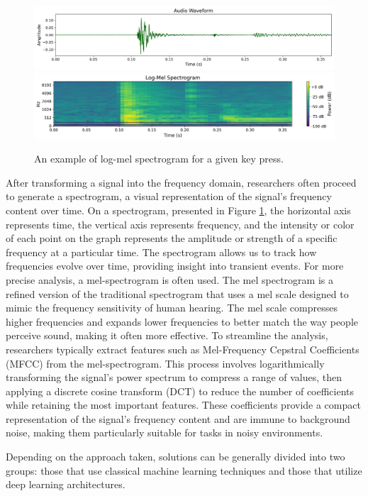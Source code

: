 \documentclass[a4paper,11pt,twoside]{report}
\theoremstyle{definition}
\begin{document}
\begin{figure}[h!]
    \centering
    \includegraphics[width=0.9\linewidth]{img_related_work/waveform.png}
    \includegraphics[width=0.9\linewidth]{img_related_work/log_mel_spectrogram.png}
    \caption{An example of log-mel spectrogram for a given key press.}
    \label{fig:spectogram}
\end{figure}

After transforming a signal into the frequency domain, researchers often proceed to generate a spectrogram, a visual representation of the signal's frequency content over time. On a spectrogram, presented in Figure \ref{fig:spectogram}, the horizontal axis represents time, the vertical axis represents frequency, and the intensity or color of each point on the graph represents the amplitude or strength of a specific frequency at a particular time. The spectrogram allows us to track how frequencies evolve over time, providing insight into transient events. For more precise analysis, a mel-spectrogram is often used. The mel spectrogram is a refined version of the traditional spectrogram that uses a mel scale designed to mimic the frequency sensitivity of human hearing. The mel scale compresses higher frequencies and expands lower frequencies to better match the way people perceive sound, making it often more effective. To streamline the analysis, researchers typically extract features such as Mel-Frequency Cepstral Coefficients (MFCC) from the mel-spectrogram. This process involves logarithmically transforming the signal's power spectrum to compress a range of values, then applying a discrete cosine transform (DCT) to reduce the number of coefficients while retaining the most important features. These coefficients provide a compact representation of the signal's frequency content and are immune to background noise, making them particularly suitable for tasks in noisy environments.

Depending on the approach taken, solutions can be generally divided into two groups: those that use classical machine learning techniques and those that utilize deep learning architectures.
\end{document}
